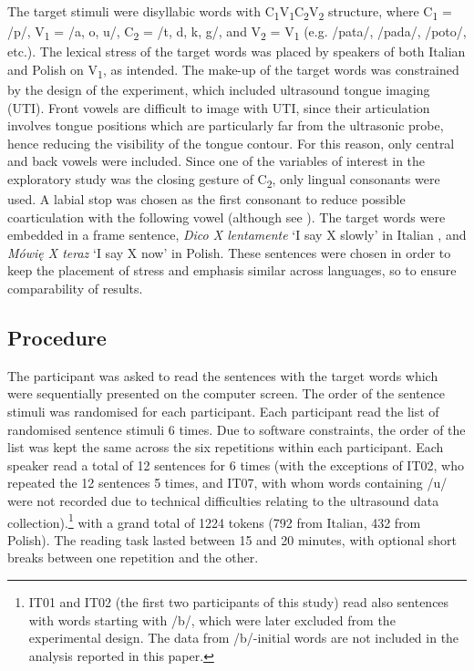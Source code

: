 \documentclass[preprint]{JASAnew}
\begin{document}
The target stimuli were disyllabic words with
C\textsubscript{1}V\textsubscript{1}C\textsubscript{2}V\textsubscript{2}
structure, where C\textsubscript{1} = /p/, V\textsubscript{1} = /a, o,
u/, C\textsubscript{2} = /t, d, k, g/, and V\textsubscript{2} =
V\textsubscript{1} (e.g. /pata/, /pada/, /poto/, etc.). The lexical
stress of the target words was placed by speakers of both Italian and
Polish on V\textsubscript{1}, as intended. The make-up of the target
words was constrained by the design of the experiment, which included
ultrasound tongue imaging (UTI). Front vowels are difficult to image
with UTI, since their articulation involves tongue positions which are
particularly far from the ultrasonic probe, hence reducing the
visibility of the tongue contour. For this reason, only central and back
vowels were included. Since one of the variables of interest in the
exploratory study was the closing gesture of C\textsubscript{2}, only
lingual consonants were used. A labial stop was chosen as the first
consonant to reduce possible coarticulation with the following vowel
(although see \citealt{vazquez-alvarez2007}). The target words were
embedded in a frame sentence, \emph{Dico X lentamente} `I say X slowly'
in Italian \citep[following][]{hajek2008}, and \emph{Mówię X teraz} `I
say X now' in Polish. These sentences were chosen in order to keep the
placement of stress and emphasis similar across languages, so to ensure
comparability of results.

\hypertarget{procedure}{%
\subsection{Procedure}\label{procedure}}

The participant was asked to read the sentences with the target words
which were sequentially presented on the computer screen. The order of
the sentence stimuli was randomised for each participant. Each
participant read the list of randomised sentence stimuli 6 times. Due to
software constraints, the order of the list was kept the same across the
six repetitions within each participant. Each speaker read a total of 12
sentences for 6 times (with the exceptions of IT02, who repeated the 12
sentences 5 times, and IT07, with whom words containing /u/ were not
recorded due to technical difficulties relating to the ultrasound data
collection).\footnote{IT01 and IT02 (the first two participants of this study) read also sentences with words starting with /b/, which were later excluded from the experimental design. The data from /b/-initial words are not included in the analysis reported in this paper.}
with a grand total of 1224 tokens (792 from Italian, 432 from Polish).
The reading task lasted between 15 and 20 minutes, with optional short
breaks between one repetition and the other.
\end{document}
